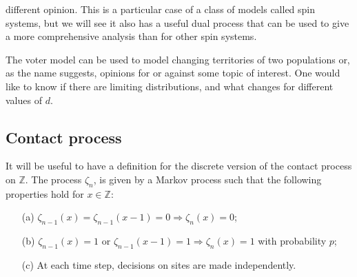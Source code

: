 \documentclass[11pt,a2paper,landscape]{article}
\begin{document}
\begin{multicols*}{3}
{different opinion. This is a particular case of a class of models called spin systems, but we will see it also has 
a useful dual process that can be used to give a more comprehensive analysis than for other spin systems.
\vspace{1ex}
 
The voter model can be used to model changing territories of two populations or, as the name suggests, opinions
for or against some topic of interest. One would like to know if there are limiting distributions, and what changes for
different values of $d$.

\subsection*{Contact process}
It will be useful to have a definition for the discrete version of the contact process on $\mathbb{Z}$. 
The process $\zeta_{n}$, is given by a Markov process such that the following properties hold for $x \in \mathbb{Z}$: 
\begin{center}
\begin{itemize}
	\item[(a)]  $\zeta_{n-1}(x)=\zeta_{n-1}(x-1)=0 \Rightarrow \zeta_{n}(x)=0$;
	\item[(b)] $\zeta_{n-1}(x)=1 \mbox{ or } \zeta_{n-1}(x-1)=1 \Rightarrow \zeta_{n}(x)=1$ with probability $p$;
	\item[(c)] At each time step, decisions on sites are made independently.
\end{itemize}
\end{center}



}
\end{multicols*}
\end{document}

